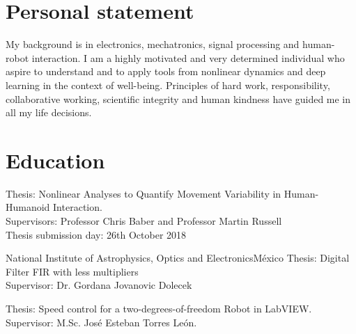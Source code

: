 \documentclass[10pt,a4paper,roman]{moderncv}
\begin{document}
\section{Personal statement}

\begin{changemargin}{2.4cm}{0.5cm}
My background is in electronics, mechatronics, signal processing 
and human-robot interaction.
I am a highly motivated and very determined individual who aspire 
to understand and to apply tools from nonlinear dynamics and deep learning 
in the context of well-being.
Principles of hard work, responsibility, collaborative working, 
scientific integrity and human kindness have guided me in all my life decisions. 
\end{changemargin}



\section{Education}
  {Thesis: Nonlinear  Analyses to Quantify Movement Variability in Human-Humanoid Interaction.
 \href{https://doi.org/10.5281/zenodo.1473140}{\faFilePdfO}
 \href{https://github.com/mxochicale/phd-thesis}{\faGithubAlt}
 \href{https://github.com/mxochicale/phd-thesis-code-data}{\faCode}
	\\ Supervisors: Professor Chris Baber and  Professor Martin Russell  
	\\ Thesis submission day: 26th October 2018	
}

  {National Institute of Astrophysics, Optics and Electronics}{M\'exico}{}
  {Thesis: Digital Filter FIR with less multipliers
  \href{https://github.com/mxochicale/publications/blob/master/Thesis/M.Sc./doc/MPXochicale_MScThesis-2016.pdf}{\faFilePdfO}
  \href{https://github.com/mxochicale/publications/tree/master/Thesis/M.Sc.}{\faGithubAlt}
  \\ Supervisor: Dr. Gordana Jovanovic Dolecek}

  {Thesis: Speed control for a two-degrees-of-freedom Robot in LabVIEW.
  \href{https://github.com/mxochicale/publications/blob/master/Thesis/B.Eng./doc/MPXochicale_BachelorEngThesis-2003.pdf}{\faFilePdfO}
  \href{https://github.com/mxochicale/publications/tree/master/Thesis/B.Eng.}{\faGithubAlt}
  \\ Supervisor: M.Sc. Jos\'e Esteban Torres Le\'on.}
\end{document}
